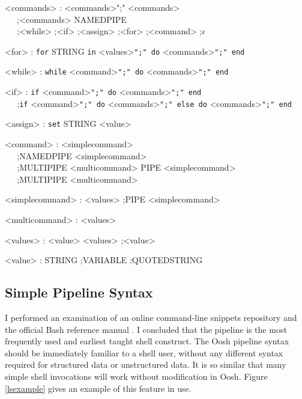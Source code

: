 \documentclass[12pt,twoside,notitlepage]{report}
\begin{document}
\label{grammar}
\begin{grammar}
<commands> : <commands>";" <commands>\\
\textcolor{white}{tab};<commands> NAMEDPIPE\\
\textcolor{white}{tab};<while> ;<if> ;<assign> ;<for> ;<command> ;$\epsilon$

<for> : {\tt for} STRING {\tt in} <values>{\tt ";" do} <commands>{\tt ";" end}

<while> : {\tt while} <command>{\tt ";" do} <commands>{\tt ";" end}

<if> : {\tt if} <command>{\tt ";" do} <commands>{\tt ";" end}\\
\textcolor{white}{tab};{\tt if} <command>{\tt ";" do} <commands>{\tt ";" else do} <commands>{\tt ";" end}

<assign> : {\tt set} STRING <value>

<command> : <simplecommand>\\
\textcolor{white}{tab};NAMEDPIPE <simplecommand>\\
\textcolor{white}{tab};MULTIPIPE <multicommand> PIPE <simplecommand>\\
\textcolor{white}{tab};MULTIPIPE <multicommand>

<simplecommand> : <values>
;PIPE <simplecommand>
    
<multicommand> : <values>

<values> : <value> <values> ;<value>

<value> : STRING ;VARIABLE ;QUOTEDSTRING

\end{grammar}

\subsection{Simple Pipeline Syntax}

I performed an examination of an online command-line snippets
repository \cite{clifu} and the official Bash reference manual
\cite{bashman}. I concluded that the pipeline is the most frequently
used and earliest taught shell construct. The Oosh pipeline syntax
should be immediately familiar to a shell user, without any different
syntax required for structured data or unstructured data. It is so
similar that many simple shell invocations will work without modification in
Oosh. Figure \ref{lsexample} gives an example of this feature in use.
\end{document}
